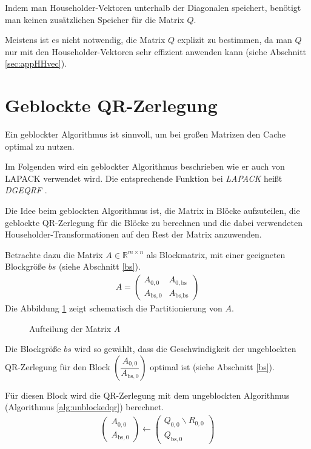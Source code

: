Indem man Householder-Vektoren unterhalb der Diagonalen speichert, benötigt man keinen zusätzlichen Speicher für die Matrix $Q$.

Meistens ist es nicht notwendig, die Matrix $Q$ explizit zu bestimmen, da man $Q$ nur mit den Householder-Vektoren sehr effizient anwenden kann (siehe Abschnitt \ref{sec:appHHvec}).



\newpage
\section{Geblockte QR-Zerlegung}
Ein geblockter Algorithmus ist sinnvoll, um bei großen Matrizen den Cache optimal zu nutzen.

Im Folgenden wird ein geblockter Algorithmus beschrieben wie er auch von LAPACK verwendet wird. Die entsprechende Funktion bei \textit{LAPACK} heißt \textit{DGEQRF} \cite{DGEQRF}.

Die Idee beim geblockten Algorithmus ist, die Matrix in Blöcke aufzuteilen, die geblockte QR-Zerlegung für die Blöcke zu berechnen und die dabei verwendeten Householder-Transformationen auf den Rest der Matrix anzuwenden.

Betrachte dazu die Matrix $A \in \mathbb{R}^{m \times n}$ als Blockmatrix, mit einer geeigneten Blockgröße $bs$ (siehe Abschnitt \ref{bs}).
\begin{align}
	A = \left(\begin{array}{l|l}
	A_{0, 0} & A_{0, \text{bs}} \\ \hline
	A_{\text{bs}, 0}   & A_{\text{bs}, \text{bs}} 	
	\end{array} \right) \label{equ:blockA}
\end{align}
Die Abbildung \ref{fig:blockA} zeigt schematisch die Partitionierung von $A$.

\begin{figure}[H]
	\centering
	
	\caption{Aufteilung der Matrix $A$}
	\label{fig:blockA}
\end{figure}

Die Blockgröße $bs$ wird so gewählt, dass die Geschwindigkeit der ungeblockten QR-Zerlegung für den Block $ \left(\dfrac{A_{0, 0}}{A_{\text{bs}, 0}} \right)$ optimal ist (siehe Abschnitt \ref{bs}).

Für diesen Block wird die  QR-Zerlegung mit dem ungeblockten Algorithmus (Algorithmus \ref{alg:unblockedqr}) berechnet.
\begin{align}
	\left(\begin{array}{l} 
	A_{0, 0} \\ \hline
	A_{\text{bs}, 0}
	\end{array}\right)
	\leftarrow
	\left(\begin{array}{l} 
	Q_{0, 0}  \backslash R_{0,0} \\ \hline
	Q_{\text{bs}, 0} 
	\end{array}\right)
\end{align}

